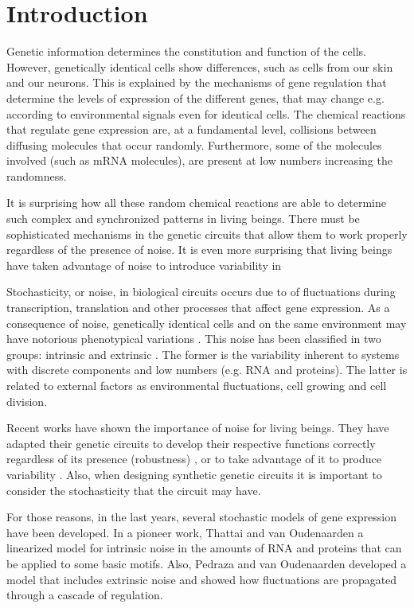 \chapter*{Introduction}

Genetic information determines the constitution and function of the cells. However, genetically identical cells show differences, such as cells from our skin and our neurons. This is explained by the mechanisms of gene regulation that determine the levels of expression of the different genes, that may change e.g. according to environmental signals even for identical cells. The chemical reactions that regulate gene expression are, at a fundamental level, collisions between diffusing molecules that occur randomly. Furthermore, some of the molecules involved (such as mRNA molecules), are present at low numbers increasing the randomness.

It is surprising how all these random chemical reactions are able to determine such complex and synchronized patterns in living beings. There must be sophisticated mechanisms in the genetic circuits that allow them to work properly regardless of the presence of noise. It is even more surprising that living beings have taken advantage of noise to introduce variability in 


Stochasticity, or noise, in biological circuits occurs due to of fluctuations during transcription, translation \cite{kaern05} and other processes that affect gene expression. As a consequence of noise, genetically identical cells and on the same environment may have notorious phenotypical variations \cite{kaern05} \cite{elowitz02} \cite{pedraza05}. This noise has been classified in two groups: intrinsic and extrinsic \cite{elowitz02} \cite{paulsson05}. The former is the variability inherent to systems with discrete components and low numbers (e.g. RNA and proteins). The latter is related to external factors as environmental fluctuations, cell growing and cell division.

Recent works have shown the importance of noise for living beings. They have adapted their genetic circuits to develop their respective functions correctly regardless of its presence (robustness) \cite{alon99}, or to take advantage of it to produce variability \cite{arkin98}. Also, when designing synthetic genetic circuits it is important to consider the stochasticity that the circuit may have.

For those reasons, in the last years, several stochastic models of gene expression have been developed. In a pioneer work, Thattai and van Oudenaarden \cite{thattai01} a linearized model for intrinsic noise in the amounts of RNA and proteins that can be applied to some basic motifs. Also, Pedraza and van Oudenaarden \cite{pedraza05} developed a model that includes extrinsic noise and showed how fluctuations are propagated through a cascade of regulation.

